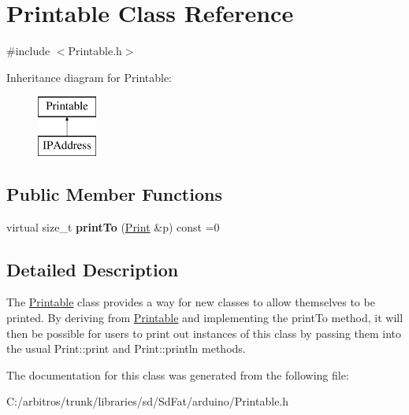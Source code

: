 \hypertarget{class_printable}{\section{Printable Class Reference}
\label{class_printable}
}


{\ttfamily \#include $<$Printable.\-h$>$}

Inheritance diagram for Printable\-:\begin{figure}[H]
\begin{center}
\leavevmode
\includegraphics[height=2.000000cm]{class_printable}
\end{center}
\end{figure}
\subsection*{Public Member Functions}
\begin{DoxyCompactItemize}
\item 
\hypertarget{class_printable_accc148ff1ab0b817ec1760a9bf3ef9a0}{virtual size\-\_\-t {\bfseries print\-To} (\hyperlink{class_print}{Print} \&p) const =0}\label{class_printable_accc148ff1ab0b817ec1760a9bf3ef9a0}

\end{DoxyCompactItemize}


\subsection{Detailed Description}
The \hyperlink{class_printable}{Printable} class provides a way for new classes to allow themselves to be printed. By deriving from \hyperlink{class_printable}{Printable} and implementing the print\-To method, it will then be possible for users to print out instances of this class by passing them into the usual Print\-::print and Print\-::println methods. 

The documentation for this class was generated from the following file\-:\begin{DoxyCompactItemize}
\item 
C\-:/arbitros/trunk/libraries/sd/\-Sd\-Fat/arduino/Printable.\-h\end{DoxyCompactItemize}
